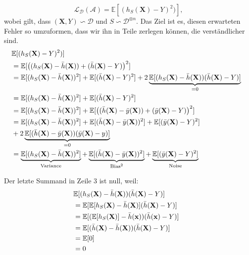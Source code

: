 $$ \mathcal{L}_{\mathcal{D}}(\mathcal{A}) = \mathbb{E}[(h_S(\mathbf{\mathbf{X}})-Y)^2)],$$
wobei gilt, dass $(\mathbf{X}, Y) \backsim \mathcal{D}$ und $S \backsim \mathcal{D}^{\otimes n}$.
Das Ziel ist es, diesen erwarteten Fehler so umzuformen, dass wir ihn in Teile zerlegen k\"onnen, die verst\"andlicher sind.
\begin{equation*}
	\begin{split}
		\lefteqn{ \mathbb{E}[(h_S(\mathbf{X})-Y)^2)] } \\\
		& = \mathbb{E}[\bigl((h_S(\mathbf{X})-\bar{h}(\mathbf{X}))+(\bar{h}(\mathbf{X})-Y)\bigr)^2] \\\
		& = \mathbb{E}[(h_S(\mathbf{X})- \bar{h}(\mathbf{X}))^2] + \mathbb{E}[(\bar{h}(\mathbf{X})-Y)^2] + 2\underbrace{\mathbb{E}[(h_S(\mathbf{X})-\bar{h}(\mathbf{X}))(\bar{h}(\mathbf{X})-Y)]}_{=0} \\\
		& = \mathbb{E}[(h_S(\mathbf{X})- \bar{h}(\mathbf{X}))^2] + \mathbb{E}[(\bar{h}(\mathbf{X})-Y)^2] \\\
		& = \mathbb{E}[(h_S(\mathbf{X})- \bar{h}(\mathbf{X}))^2] + \mathbb{E}[\bigl( (\bar{h}(\mathbf{X})-\bar{y}(\mathbf{X}))+(\bar{y}(\mathbf{X})-Y)\bigr)^2 ] \\\
		& = \mathbb{E}[(h_S(\mathbf{X})- \bar{h}(\mathbf{X}))^2] + \mathbb{E}[(\bar{h}(\mathbf{X})-\bar{y}(\mathbf{X}))^2] +\mathbb{E}[(\bar{y}(\mathbf{X})-Y)^2] \\\
		&+ 2\underbrace{\mathbb{E}[(\bar{h}(\mathbf{X})-\bar{y}(\mathbf{X}))(\bar{y}(\mathbf{X})-y)]}_{=0} \\\
		& = \underbrace{\mathbb{E}[(h_S(\mathbf{X})- \bar{h}(\mathbf{X}))^2]}_{\text{Variance}}+\underbrace{\mathbb{E}[(\bar{h}(\mathbf{X})-\bar{y}(\mathbf{X}))^2]}_{\text{Bias}^2} + \underbrace{\mathbb{E}[(\bar{y}(\mathbf{X})-Y)^2]}_{\text{Noise}}
	\end{split}
\end{equation*}

Der letzte Summand in Zeile 3 ist null, weil:
\begin{equation*}
	\begin{split}
		\lefteqn{ \mathbb{E}[(h_S(\mathbf{X})-\bar{h}(\mathbf{X}))(\bar{h}(\mathbf{X})-Y)] } \\\
		& = \mathbb{E}[\mathbb{E}[h_S(\mathbf{X})-\bar{h}(\mathbf{X})](\bar{h}(\mathbf{X})-Y)] \\\
		& = \mathbb{E}[(\mathbb{E}[h_S(\mathbf{X})]-\bar{h}(\mathbf{x}))(\bar{h}(\mathbf{x})-Y)] \\\
		& = \mathbb{E}[(\bar{h}(\mathbf{X})-\bar{h}(\mathbf{X}))(\bar{h}(\mathbf{X})-Y)] \\\
		& = \mathbb{E}[0]\\\
		& = 0
	\end{split}
\end{equation*}


